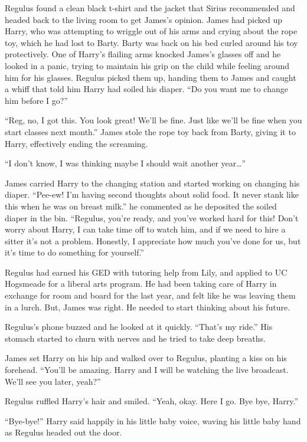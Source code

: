 \documentclass[12pt,twoside,openright]{memoir}
\begin{document}
Regulus found a clean black t-shirt and the jacket that Sirius recommended and headed back to the living room to get James's opinion. James had picked up Harry, who was attempting to wriggle out of his arms and crying about the rope toy, which he had lost to Barty. Barty was back on his bed curled around his toy protectively. One of Harry's flailing arms knocked James's glasses off and he looked in a panic, trying to maintain his grip on the child while feeling around him for his glasses. Regulus picked them up, handing them to James and caught a whiff that told him Harry had soiled his diaper. ``Do you want me to change him before I go?''

``Reg, no, I got this. You look great! We'll be fine. Just like we'll be fine when you start classes next month.'' James stole the rope toy back from Barty, giving it to Harry, effectively ending the screaming. 

``I don't know, I was thinking maybe I should wait another year…''

James carried Harry to the changing station and started working on changing his diaper. ``Pee-ew! I'm having second thoughts about solid food. It never stank like this when he was on breast milk.'' he commented as he deposited the soiled diaper in the bin. ``Regulus, you're ready, and you've worked hard for this! Don't worry about Harry, I can take time off to watch him, and if we need to hire a sitter it's not a problem. Honestly, I appreciate how much you've done for us, but it's time to do something for yourself.''

Regulus had earned his GED with tutoring help from Lily, and applied to UC Hogsmeade for a liberal arts program. He had been taking care of Harry in exchange for room and board for the last year, and felt like he was leaving them in a lurch. But, James was right. He needed to start thinking about his future. 

Regulus's phone buzzed and he looked at it quickly. ``That's my ride.'' His stomach started to churn with nerves and he tried to take deep breaths. 

James set Harry on his hip and walked over to Regulus, planting a kiss on his forehead. ``You'll be amazing. Harry and I will be watching the live broadcast. We'll see you later, yeah?''

Regulus ruffled Harry's hair and smiled. ``Yeah, okay. Here I go. Bye bye, Harry.''

``Bye-bye!'' Harry said happily in his little baby voice, waving his little baby hand as Regulus headed out the door.
\end{document}
